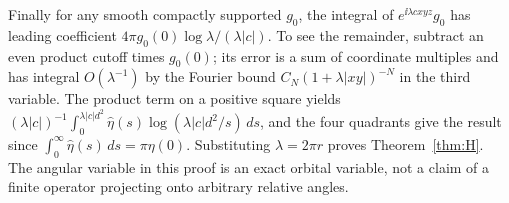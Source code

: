Finally for any smooth compactly supported \(g_0\), the integral of \(e^{\ii\lambda cxyz}g_0\) has leading coefficient \(4\pi g_0(0)\log\lambda/(\lambda|c|)\). To see the remainder, subtract an even product cutoff times \(g_0(0)\); its error is a sum of coordinate multiples and has integral \(O(\lambda^{-1})\) by the Fourier bound \(C_N(1+\lambda|xy|)^{-N}\) in the third variable. The product term on a positive square yields \((\lambda|c|)^{-1}\int_0^{\lambda|c|d^2}\widehat\eta(s)\log(\lambda|c|d^2/s)\,ds\), and the four quadrants give the result since \(\int_0^\infty\widehat\eta(s)\,ds=\pi\eta(0)\). Substituting \(\lambda=2\pi r\) proves Theorem~\ref{thm:H}. The angular variable in this proof is an exact orbital variable, not a claim of a finite operator projecting onto arbitrary relative angles.
